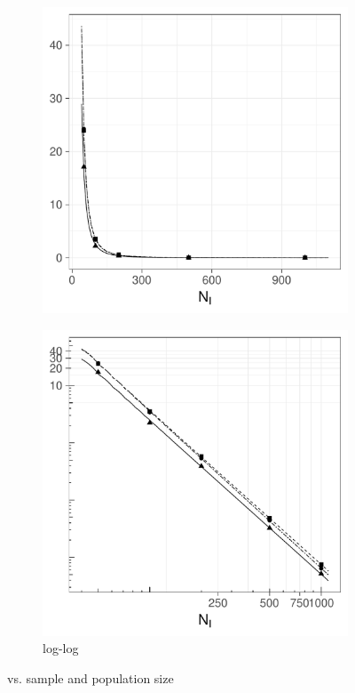 \begin{figure}[htbp]
    \begin{subfigure}[b]{0.49\textwidth}
        \includegraphics[width=\textwidth]{results/by_pop_size/NMISE-vs-population}
        \caption{}
        \label{fig:ise:unifNpop_1h:nmise}
    \end{subfigure}
    \begin{subfigure}[b]{0.49\textwidth}
        \includegraphics[width=\textwidth]{results/by_pop_size/NMISE-vs-population-log-log}
        \caption{ log-log}
        \label{fig:ise:unifNpop_1h:nmise_log_log}
    \end{subfigure}
    \caption[: by sample and population size]{ vs. sample and population size}
    \label{fig:ise:unifNpop_1h}
\end{figure}

